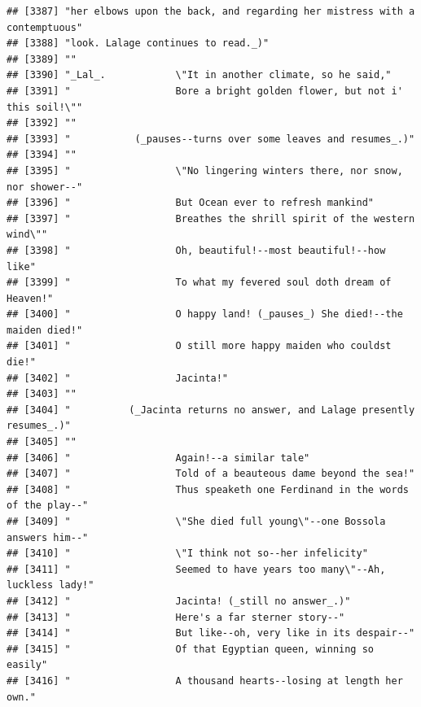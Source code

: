 \documentclass{article}\usepackage[]{graphicx}\usepackage[]{color}
\makeatletter
\newenvironment{kframe}{%
 \def\at@end@of@kframe{}%
 \ifinner\ifhmode%
  \def\at@end@of@kframe{\end{minipage}}%
  \begin{minipage}{\columnwidth}%
 \fi\fi%
 \def\FrameCommand##1{\hskip\@totalleftmargin \hskip-\fboxsep
 \colorbox{shadecolor}{##1}\hskip-\fboxsep
     \hskip-\linewidth \hskip-\@totalleftmargin \hskip\columnwidth}%
 \MakeFramed {\advance\hsize-\width
   \@totalleftmargin\z@ \linewidth\hsize
   \@setminipage}}%
 {\par\unskip\endMakeFramed%
 \at@end@of@kframe}
\newenvironment{knitrout}{}{} %
\makeatother
\begin{document}
\begin{knitrout}
\begin{kframe}
\begin{verbatim}
## [3387] "her elbows upon the back, and regarding her mistress with a contemptuous"    
## [3388] "look. Lalage continues to read._)"                                           
## [3389] ""                                                                            
## [3390] "_Lal_.            \"It in another climate, so he said,"                      
## [3391] "                  Bore a bright golden flower, but not i' this soil!\""      
## [3392] ""                                                                            
## [3393] "           (_pauses--turns over some leaves and resumes_.)"                  
## [3394] ""                                                                            
## [3395] "                  \"No lingering winters there, nor snow, nor shower--"      
## [3396] "                  But Ocean ever to refresh mankind"                         
## [3397] "                  Breathes the shrill spirit of the western wind\""          
## [3398] "                  Oh, beautiful!--most beautiful!--how like"                 
## [3399] "                  To what my fevered soul doth dream of Heaven!"             
## [3400] "                  O happy land! (_pauses_) She died!--the maiden died!"      
## [3401] "                  O still more happy maiden who couldst die!"                
## [3402] "                  Jacinta!"                                                  
## [3403] ""                                                                            
## [3404] "          (_Jacinta returns no answer, and Lalage presently resumes_.)"      
## [3405] ""                                                                            
## [3406] "                  Again!--a similar tale"                                    
## [3407] "                  Told of a beauteous dame beyond the sea!"                  
## [3408] "                  Thus speaketh one Ferdinand in the words of the play--"    
## [3409] "                  \"She died full young\"--one Bossola answers him--"        
## [3410] "                  \"I think not so--her infelicity"                          
## [3411] "                  Seemed to have years too many\"--Ah, luckless lady!"       
## [3412] "                  Jacinta! (_still no answer_.)"                             
## [3413] "                  Here's a far sterner story--"                              
## [3414] "                  But like--oh, very like in its despair--"                  
## [3415] "                  Of that Egyptian queen, winning so easily"                 
## [3416] "                  A thousand hearts--losing at length her own."              

\end{verbatim}
\end{kframe}
\end{knitrout}
\end{document}
